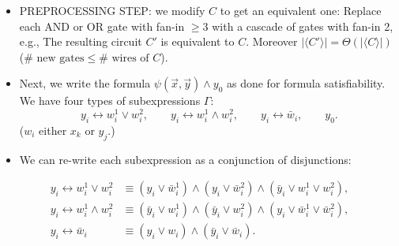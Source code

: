 \begin{itemize}\item PREPROCESSING STEP: we modify $C$ to get an equivalent one:
Replace each AND or OR gate with fan-in $\geq3$ with a cascade of gates with fan-in 2, e.g.,
The resulting circuit $C'$ is equivalent to $C$. Moreover $|\langle C'\rangle|=\Theta(|\langle C\rangle|)$ ($\#\text{ new gates}\leq\#\text{ wires of }C$).
\item Next, we write the formula $\psi(\vec x,\vec y)\land y_0$ as done for formula satisfiability.
We have four types of subexpressions $\Gamma$:
\[
y_i\leftrightarrow w_i^1\lor w_i^2,\qquad y_i\leftrightarrow w_i^1\land w_i^2,\qquad y_i\leftrightarrow\bar w_i,\qquad y_0.
\]
($w_i$ either $x_k$ or $y_j$.)
\item We can re-write each subexpression as a conjunction of disjunctions:
\end{itemize}
\[
\begin{aligned}
y_i\leftrightarrow w_i^1\lor w_i^2
&\equiv(y_i\lor\bar w_i^1)\land(y_i\lor\bar w_i^2)\land(\bar y_i\lor w_i^1\lor w_i^2),\\
y_i\leftrightarrow w_i^1\land w_i^2
&\equiv(\bar y_i\lor w_i^1)\land(\bar y_i\lor w_i^2)\land(y_i\lor\bar w_i^1\lor\bar w_i^2),\\
y_i\leftrightarrow\bar w_i&\equiv(y_i\lor w_i)\land(\bar y_i\lor\bar w_i).
\end{aligned}
\]
